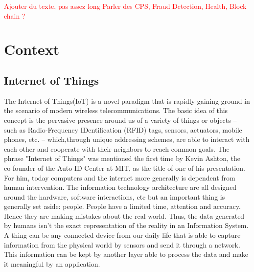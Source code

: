 \documentclass[11pt]{article}
\begin{document}
\textcolor{red}{Ajouter du texte, pas assez long}
\textcolor{red}{Parler des CPS, Fraud Detection, Health, Block chain ?}
\newpage



\section{Context}

\subsection{Internet of Things}

The Internet of Things(IoT) is a novel paradigm that is rapidly gaining ground in the scenario of modern wireless telecommunications. The basic idea of this concept is the pervasive presence around us of a variety of things or objects – such as Radio-Frequency IDentification (RFID) tags, sensors, actuators, mobile phones, etc. – which,through unique addressing schemes, are able to interact with each other and cooperate with their neighbors to reach common goals. \cite{2}
\newline
\newline
The phrase "Internet of Things" was mentioned the first time by Kevin Ashton, the co-founder of the Auto-ID Center at MIT, as the title of one of his presentation. For him, today computers and the internet more generally is dependent from human intervention. The information technology architecture are all designed around the hardware, software interactions, etc but an important thing is generally set aside: people. People have a limited time, attention and accuracy. Hence they are making mistakes about the real world. Thus, the data generated by humans isn't the exact representation of the reality in an Information System.
\newline
\newline
A thing can be any connected device from our daily life that is able to capture information from the physical world by sensors and send it through a network. This information can be kept by another layer able to process the data and make it meaningful by an application. 
\end{document}
